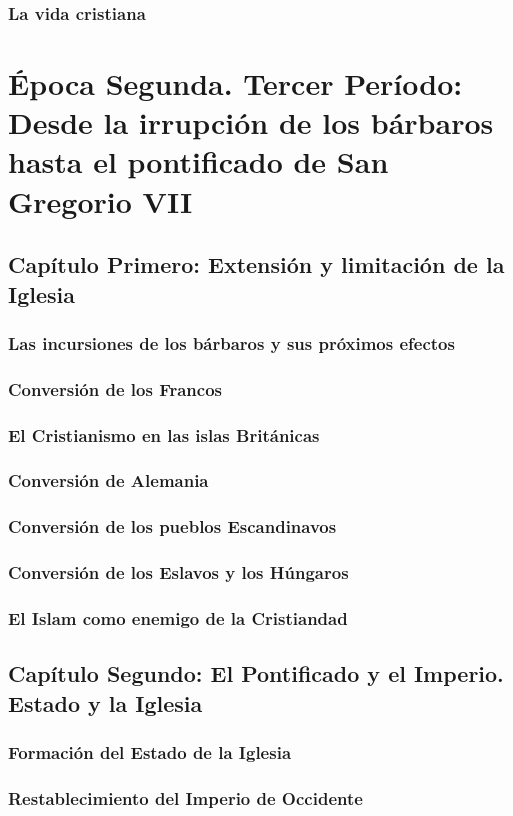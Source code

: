 \raggedbottom{} \documentclass[12pt, a4paper, openany]{book} %
\begin{document}
\section{La vida cristiana}
\part{Época Segunda. Tercer Período: Desde la irrupción de los bárbaros hasta el pontificado de San Gregorio VII}
\chapter{Capítulo Primero: Extensión y limitación de la Iglesia}
\section{Las incursiones de los bárbaros y sus próximos efectos}
\section{Conversión de los Francos}
\section{El Cristianismo en las islas Británicas}
\section{Conversión de Alemania}
\section{Conversión de los pueblos Escandinavos}
\section{Conversión de los Eslavos y los Húngaros}
\section{El Islam como enemigo de la Cristiandad}
\chapter{Capítulo Segundo: El Pontificado y el Imperio. Estado y la Iglesia}
\section{Formación del Estado de la Iglesia}
\section{Restablecimiento del Imperio de Occidente}
\end{document}
